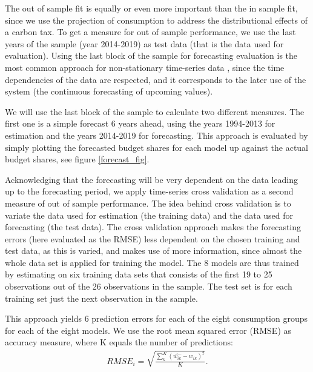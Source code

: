 The out of sample fit is equally or even more important than the in sample fit, since we use the projection of consumption to address the distributional effects of a carbon tax. To get a measure for out of sample performance, we use the last years of the sample (year 2014-2019) as test data (that is the data used for evaluation). Using the last block of the sample for forecasting evaluation is the most common approach for non-stationary time-series data \citep{forecastingbergmeir}, since the time dependencies of the data are respected, and it corresponds to the later use of the system (the continuous forecasting of upcoming values).

We will use the last block of the sample to calculate two different measures. The first one is a simple forecast 6 years ahead, using the years 1994-2013 for estimation and the years 2014-2019 for forecasting. This approach is evaluated by simply plotting the forecasted budget shares for each model up against the actual budget shares, see figure \ref{forecast_fig}.

Acknowledging that the forecasting will be very dependent on the data leading up to the forecasting period, we apply time-series cross validation as a second measure of out of sample performance. The idea behind cross validation is to variate the data used for estimation (the training data) and the data used for forecasting (the test data). The cross validation approach makes the forecasting errors (here evaluated as the RMSE) less dependent on the chosen training and test data, as this is varied, and makes use of more information, since almost the whole data set is applied for training the model. The 8 models are thus trained by estimating on six training data sets that consists of the first 19 to 25 observations out of the 26 observations in the sample. The test set is for each training set just the next observation in the sample. 

This approach yields 6 prediction errors for each of the eight consumption groups for each of the eight models. We use the root mean squared error (RMSE) as accuracy measure, where K equals the number of predictions:
\begin{align}
    RMSE_i = \sqrt{\frac{\sum_k^K(\hat{w_{ik}}-w_{ik})^2}{K}}.
\end{align}

